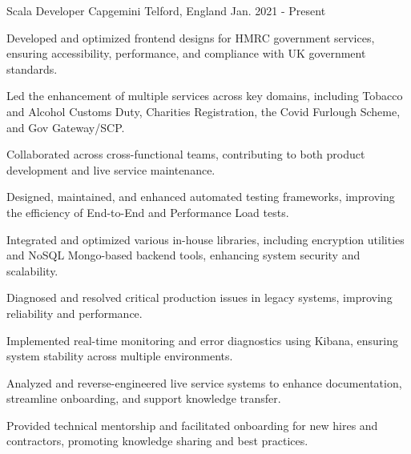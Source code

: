 
\begin{cventries}

  \cventry
    {Scala Developer} %
    {Capgemini} %
    {Telford, England} %
    {Jan. 2021 - Present} %
    {
      \raggedright
      \begin{cvitems}
        \item {Developed and optimized frontend designs for HMRC government services, ensuring accessibility, performance, and compliance with UK government standards.}
        \item {Led the enhancement of multiple services across key domains, including Tobacco and Alcohol Customs Duty, Charities Registration, the Covid Furlough Scheme, and Gov Gateway/SCP.}
        \item {Collaborated across cross-functional teams, contributing to both product development and live service maintenance.}
        \item {Designed, maintained, and enhanced automated testing frameworks, improving the efficiency of End-to-End and Performance Load tests.}
        \item {Integrated and optimized various in-house libraries, including encryption utilities and NoSQL Mongo-based backend tools, enhancing system security and scalability.}
        \item {Diagnosed and resolved critical production issues in legacy systems, improving reliability and performance.}
        \item {Implemented real-time monitoring and error diagnostics using Kibana, ensuring system stability across multiple environments.}
        \item {Analyzed and reverse-engineered live service systems to enhance documentation, streamline onboarding, and support knowledge transfer.}
        \item {Provided technical mentorship and facilitated onboarding for new hires and contractors, promoting knowledge sharing and best practices.}
      \end{cvitems}
    }

\end{cventries}
